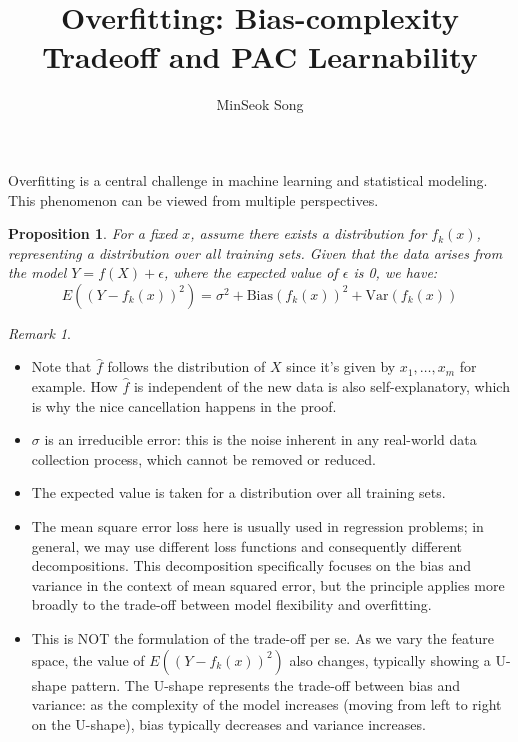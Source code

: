 \documentclass[11pt,reqno]{amsart}
\newtheorem{proposition}[theorem]{Proposition}
\theoremstyle{remark}
\newtheorem{remark}[example]{Remark}
\begin{document}
\title{Overfitting: Bias-complexity Tradeoff and PAC Learnability}
\author{MinSeok Song}
\date{}
\maketitle
Overfitting is a central challenge in machine learning and statistical modeling. This phenomenon can be viewed from multiple perspectives.
\begin{proposition}
For a fixed $x$, assume there exists a distribution for 
$f_k(x)$, representing a distribution over all training sets. 
Given that the data arises from the model $Y=f(X)+\epsilon$, 
where the expected value of $\epsilon$ is 0, we have:
\[E((Y-f_k(x))^2) = \sigma^2 + \text{Bias}(f_k(x))^2 + \text{Var}(f_k(x))\]
\end{proposition}
\begin{remark}
\begin{itemize}
\item Note that $\hat f$ follows the distribution of $X$ since 
it's given by $x_1,\dots,x_m$ for example. How $\hat f$ is 
independent of the new data is also self-explanatory, which is why 
the nice cancellation happens in the proof.

\item $\sigma$ is an irreducible error: this is the noise inherent in any real-world data collection process, which cannot be removed or reduced.

\item The expected value is taken for a distribution over all training sets.

\item The mean square error loss here is usually used in regression problems; in general, we may use different loss functions and consequently different decompositions. This decomposition specifically focuses on the bias and variance in the context of mean squared error, but the principle applies more broadly to the trade-off between model flexibility and overfitting.

\item This is NOT the formulation of the trade-off per se. As we vary the feature space, the value of $E((Y-f_k(x))^2)$ also changes, typically showing a U-shape pattern. The U-shape represents the trade-off between bias and variance: as the complexity of the model increases (moving from left to right on the U-shape), bias typically decreases and variance increases.


\end{itemize}
\end{remark}
\end{document}
